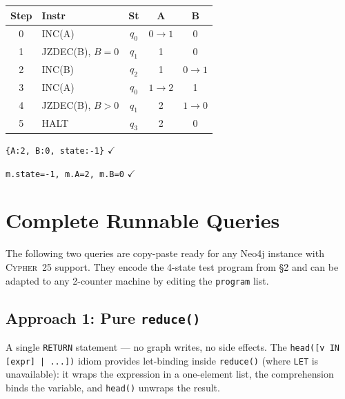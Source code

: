 \documentclass[9pt,a4paper,twocolumn]{article}
\begin{document}
{\small
\begin{tabular}{@{}clccc@{}}
\toprule
\textbf{Step} & \textbf{Instr} & \textbf{St} & \textbf{A} & \textbf{B} \\
\midrule
0 & INC(A) & $q_0$ & $0{\to}1$ & 0 \\
1 & JZDEC(B), $B{=}0$ & $q_1$ & 1 & 0 \\
2 & INC(B) & $q_2$ & 1 & $0{\to}1$ \\
3 & INC(A) & $q_0$ & $1{\to}2$ & 1 \\
4 & JZDEC(B), $B{>}0$ & $q_1$ & 2 & $1{\to}0$ \\
5 & HALT & $q_3$ & 2 & 0 \\
\bottomrule
\end{tabular}}

\begin{sresult}
\texttt{\{A:2, B:0, state:-1\}} \enspace$\checkmark$
\end{sresult}

\begin{sresult}
\texttt{m.state=-1, m.A=2, m.B=0} \enspace$\checkmark$
\end{sresult}

\section{Complete Runnable Queries}

The following two queries are copy-paste ready for any Neo4j instance
with \textsc{Cypher~25} support. They encode the 4-state test program
from \S2 and can be adapted to any 2-counter machine by editing the
\texttt{program} list.

\subsection{Approach 1: Pure \texttt{reduce()}}

A single \texttt{RETURN} statement --- no graph writes, no side effects.
The \texttt{head([v IN [expr] | ...])} idiom provides let-binding
inside \texttt{reduce()} (where \texttt{LET} is unavailable): it wraps
the expression in a one-element list, the comprehension binds the
variable, and \texttt{head()} unwraps the result.
\end{document}
